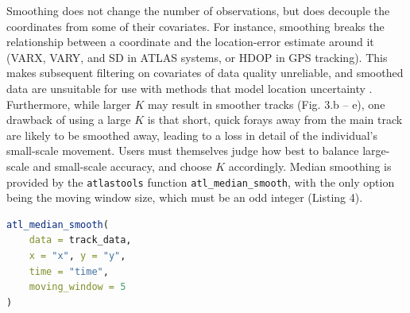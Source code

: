 \documentclass[10pt,paper=a4,headings=standardclasses
]{scrartcl}
\begin{document}
Smoothing does not change the number of observations, but does decouple the coordinates from some of their covariates.
For instance, smoothing breaks the relationship between a coordinate and the location-error estimate around it (VARX, VARY, and SD in ATLAS systems, or HDOP in GPS tracking).
This makes subsequent filtering on covariates of data quality unreliable, and smoothed data are unsuitable for use with methods that model location uncertainty \citep{noonan2019, fleming2014a, fleming2020, calabrese2016}.
Furthermore, while larger $K$ may result in smoother tracks (Fig. 3.b -- e), one drawback of using a large $K$ is that short, quick forays away from the main track are likely to be smoothed away, leading to a loss in detail of the individual's small-scale movement.
Users must themselves judge how best to balance large-scale and small-scale accuracy, and choose $K$ accordingly.
Median smoothing is provided by the \texttt{atlastools} function \texttt{atl\_median\_smooth}, with the only option being the moving window size, which must be an odd integer (Listing 4).

\begin{lstlisting}[float, language=R, style=customR, caption = {
    Median smoothing a movement track using the function \texttt{atl\_median\_smooth} function with a moving window \textit{K = 5}. 
    Larger values of $K$ yield smoother tracks, but $K$ should always be some orders of magnitude lower than the number of observations.}]
atl_median_smooth(
    data = track_data,
    x = "x", y = "y",
    time = "time",
    moving_window = 5
)
\end{lstlisting}
\end{document}
